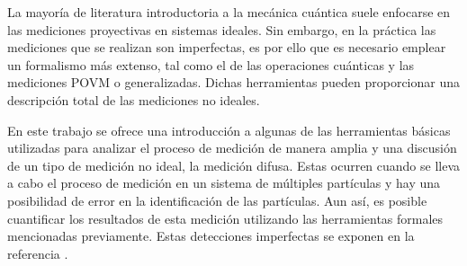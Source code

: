 \documentclass[12pt,oneside]{book}\raggedbottom{} %
\begin{document}
\begin{sloppypar}
{{


La mayoría de literatura introductoria a la mecánica cuántica suele enfocarse en las mediciones proyectivas en sistemas ideales. %
Sin embargo, en la práctica las mediciones que se realizan son imperfectas, es por ello que es necesario emplear un formalismo más extenso, tal como el de las operaciones cuánticas y las mediciones POVM o generalizadas. Dichas herramientas pueden proporcionar una descripción total de las mediciones no ideales. 





En este trabajo se ofrece una introducción a algunas de las herramientas básicas utilizadas para analizar el proceso de medición de manera amplia y una discusión de un tipo de medición no ideal, la medición difusa. Estas ocurren cuando se lleva a cabo el proceso de medición en un sistema de múltiples partículas y hay una posibilidad de error en la identificación de las partículas. Aun así, es posible cuantificar los resultados de esta medición utilizando las herramientas formales mencionadas previamente. Estas detecciones imperfectas se exponen en la referencia {\cite{Pineda_2021}}. %



}}
\end{sloppypar}
\end{document}
